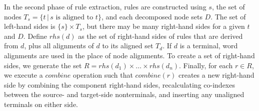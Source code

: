 \documentclass[11pt]{article}
\begin{document}

In the second phase of rule extraction, rules are constructed using $s$, the set of nodes $T_s = \{ t\,|\,s \text{ is aligned to } t\}$, and each decomposed node sets $D$.  The set of left-hand sides is $\{s\} \times T_s$, but there may be many right-hand sides for a given $t$ and $D$. Define $rhs(d)$ as the set of right-hand sides of rules that are derived from $d$, plus all alignments of $d$ to its aligned set $T_d$. If $d$ is a terminal, word alignments are used in the place of node alignments. To create a set of right-hand sides, we generate the set $R = rhs(d_1) \times \ldots \times rhs(d_n)$.  Finally, for each $r \in R$, we execute a $combine$ operation such that $combine(r)$ creates a new right-hand side by combining the component right-hand sides, recalculating co-indexes between the source- and target-side nonterminals, and inserting any unaligned terminals on either side.
\end{document}
